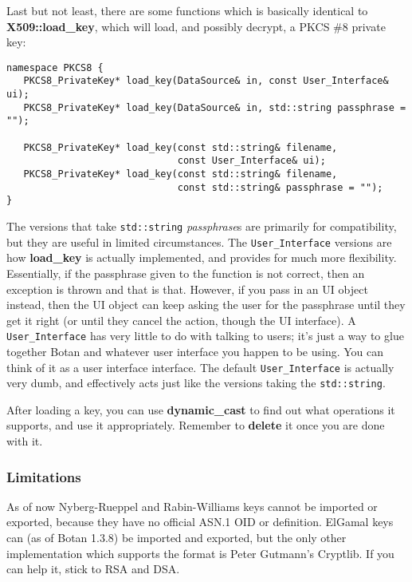 \documentclass{article}
\newcommand{\function}[1]{\textbf{#1}}
\newcommand{\type}[1]{\texttt{#1}}
\renewcommand{\arg}[1]{\textsl{#1}}
\begin{document}
Last but not least, there are some functions which is basically identical to
\function{X509::load\_key}, which will load, and possibly decrypt, a PKCS \#8
private key:

\begin{verbatim}
namespace PKCS8 {
   PKCS8_PrivateKey* load_key(DataSource& in, const User_Interface& ui);
   PKCS8_PrivateKey* load_key(DataSource& in, std::string passphrase = "");

   PKCS8_PrivateKey* load_key(const std::string& filename,
                              const User_Interface& ui);
   PKCS8_PrivateKey* load_key(const std::string& filename,
                              const std::string& passphrase = "");
}
\end{verbatim}

The versions that take \type{std::string} \arg{passphrase}s are primarily for
compatibility, but they are useful in limited circumstances. The
\type{User\_Interface} versions are how \function{load\_key} is actually
implemented, and provides for much more flexibility. Essentially, if the
passphrase given to the function is not correct, then an exception is thrown
and that is that. However, if you pass in an UI object instead, then the UI
object can keep asking the user for the passphrase until they get it right (or
until they cancel the action, though the UI interface). A
\type{User\_Interface} has very little to do with talking to users; it's just a
way to glue together Botan and whatever user interface you happen to be
using. You can think of it as a user interface interface. The default
\type{User\_Interface} is actually very dumb, and effectively acts just like
the versions taking the \type{std::string}.

After loading a key, you can use \function{dynamic\_cast} to find out what
operations it supports, and use it appropriately. Remember to \function{delete}
it once you are done with it.

\subsubsection{Limitations}

As of now Nyberg-Rueppel and Rabin-Williams keys cannot be imported or
exported, because they have no official ASN.1 OID or definition. ElGamal keys
can (as of Botan 1.3.8) be imported and exported, but the only other
implementation which supports the format is Peter Gutmann's Cryptlib. If you
can help it, stick to RSA and DSA.
\end{document}
